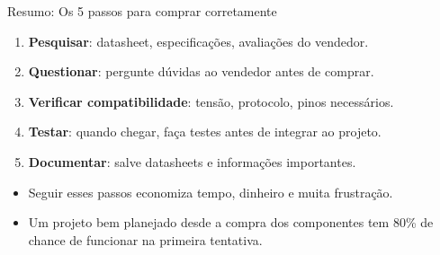 \documentclass[10pt]{beamer}
\begin{document}
\begin{frame}{Resumo: Os 5 passos para comprar corretamente}
  \begin{enumerate}
    \item \textbf{Pesquisar}: datasheet, especificações, avaliações do vendedor.
    \item \textbf{Questionar}: pergunte dúvidas ao vendedor antes de comprar.
    \item \textbf{Verificar compatibilidade}: tensão, protocolo, pinos necessários.
    \item \textbf{Testar}: quando chegar, faça testes antes de integrar ao projeto.
    \item \textbf{Documentar}: salve datasheets e informações importantes.
  \end{enumerate}
  
  \begin{itemize}
    \item Seguir esses passos economiza tempo, dinheiro e muita frustração.
    \item Um projeto bem planejado desde a compra dos componentes tem 80\% de chance de funcionar na primeira tentativa.
  \end{itemize}
\end{frame}
\end{document}
